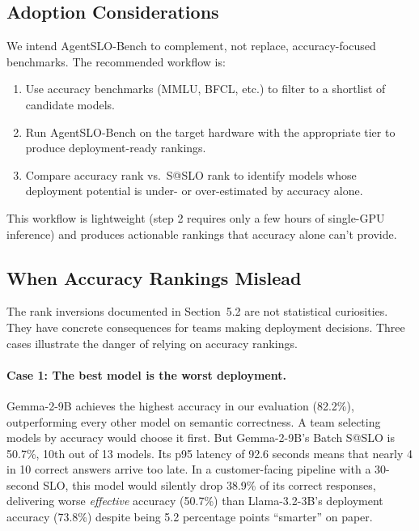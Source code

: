 \documentclass[11pt]{article}
\begin{document}
\subsection{Adoption Considerations}

We intend AgentSLO-Bench to complement, not replace, accuracy-focused benchmarks.  The recommended workflow is:

\begin{enumerate}[leftmargin=*]
\item Use accuracy benchmarks (MMLU, BFCL, etc.) to filter to a shortlist of candidate models.
\item Run AgentSLO-Bench on the target hardware with the appropriate tier to produce deployment-ready rankings.
\item Compare accuracy rank vs.\ S@SLO rank to identify models whose deployment potential is under- or over-estimated by accuracy alone.
\end{enumerate}

This workflow is lightweight (step 2 requires only a few hours of single-GPU inference) and produces actionable rankings that accuracy alone can't provide.

\subsection{When Accuracy Rankings Mislead}

The rank inversions documented in Section~5.2 are not statistical curiosities.  They have concrete consequences for teams making deployment decisions.  Three cases illustrate the danger of relying on accuracy rankings.

\paragraph{Case 1: The best model is the worst deployment.}
Gemma-2-9B achieves the highest accuracy in our evaluation (82.2\%), outperforming every other model on semantic correctness.  A team selecting models by accuracy would choose it first.  But Gemma-2-9B's Batch S@SLO is 50.7\%, 10th out of 13 models.  Its p95 latency of 92.6 seconds means that nearly 4 in 10 correct answers arrive too late.  In a customer-facing pipeline with a 30-second SLO, this model would silently drop 38.9\% of its correct responses, delivering worse \emph{effective} accuracy (50.7\%) than Llama-3.2-3B's deployment accuracy (73.8\%) despite being 5.2 percentage points ``smarter'' on paper.
\end{document}
